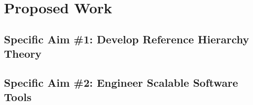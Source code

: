 \documentclass[11pt,proposal]{ucthesis}
\begin{document}




\chapter{Proposed Work}

\section{Specific Aim \#1: Develop Reference Hierarchy Theory}




\section{Specific Aim \#2: Engineer Scalable Software Tools}


    
    
    

    

    
\end{document}
